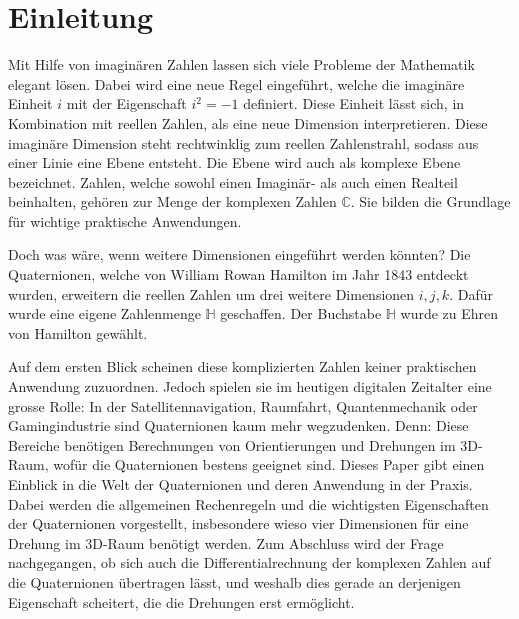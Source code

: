 %
%
%
%
\section{Einleitung\label{qa:section:einleitung}}
Mit Hilfe von imaginären Zahlen lassen sich viele Probleme der 
Mathematik elegant lösen. Dabei wird eine neue Regel eingeführt, 
welche die imaginäre Einheit $i$ mit der Eigenschaft $i^2 = -1$ 
definiert. Diese Einheit lässt sich, in Kombination mit reellen 
Zahlen, als eine neue Dimension interpretieren. Diese imaginäre 
Dimension steht rechtwinklig zum reellen Zahlenstrahl, sodass aus 
einer Linie eine Ebene entsteht. Die Ebene wird auch als komplexe 
Ebene bezeichnet. Zahlen, welche sowohl einen Imaginär- als auch 
einen Realteil beinhalten, gehören zur Menge der komplexen Zahlen 
$\mathbb{C}$. Sie bilden die Grundlage für wichtige praktische 
Anwendungen.

Doch was wäre, wenn weitere Dimensionen eingeführt werden könnten? 
Die Quaternionen, welche von William Rowan Hamilton im Jahr 1843 
%
%
entdeckt wurden, erweitern die reellen Zahlen um drei weitere 
Dimensionen $i,j,k$. Dafür wurde eine eigene Zahlenmenge $\mathbb{H}
$ geschaffen. Der Buchstabe $\mathbb{H}$ wurde zu Ehren von 
Hamilton gewählt.
%

Auf dem ersten Blick scheinen diese komplizierten Zahlen keiner 
praktischen Anwendung zuzuordnen. Jedoch spielen sie im heutigen 
digitalen Zeitalter eine grosse Rolle: In der Satellitennavigation, 
%
Raumfahrt, Quantenmechanik oder Gamingindustrie sind Quaternionen 
%
%
%
kaum mehr wegzudenken. Denn: Diese Bereiche benötigen Berechnungen 
von Orientierungen und Drehungen im 3D-Raum, wofür die Quaternionen 
bestens geeignet sind. Dieses Paper gibt einen Einblick in die Welt 
der Quaternionen und deren Anwendung in der Praxis. Dabei werden 
die allgemeinen Rechenregeln und die wichtigsten Eigenschaften der 
Quaternionen vorgestellt, insbesondere wieso vier Dimensionen für
eine Drehung im 3D-Raum benötigt werden. Zum Abschluss wird der 
Frage nachgegangen, ob sich auch die Differentialrechnung der 
komplexen Zahlen auf die Quaternionen übertragen lässt, und weshalb 
dies gerade an derjenigen Eigenschaft scheitert, die die Drehungen 
erst ermöglicht.

